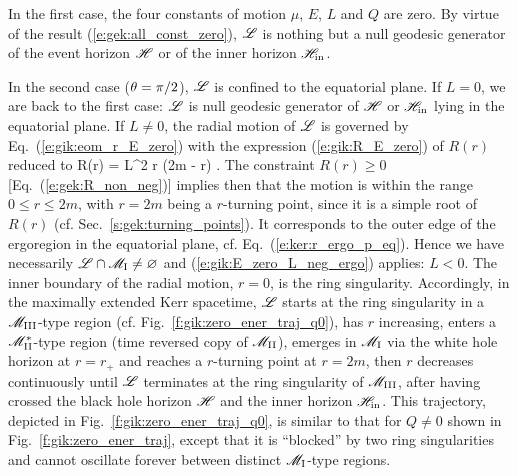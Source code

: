 In the first case, the four constants of motion $\mu$, $E$, $L$ and $Q$ are
zero. By virtue of the result (\ref{e:gek:all_const_zero}), $\mathscr{L}$
is nothing but a null geodesic generator of the event horizon $\mathscr{H}$ or of the
inner horizon $\mathscr{H}_{\rm in}$.

In the second case ($\theta=\pi/2$), $\mathscr{L}$ is confined to the equatorial plane.
If $L=0$, we are back to the first case: $\mathscr{L}$ is null geodesic generator of $\mathscr{H}$ or
$\mathscr{H}_{\rm in}$ lying in the equatorial plane.
If $L\neq 0$, the radial motion of $\mathscr{L}$ is governed by Eq.~(\ref{e:gik:eom_r_E_zero}) with the
expression (\ref{e:gik:R_E_zero}) of $R(r)$ reduced to
\be
    R(r) = L^2 r (2m - r) .
\ee
The constraint $R(r) \geq 0$ [Eq.~(\ref{e:gek:R_non_neg})] implies then
that the motion is within the range $0 \leq r \leq 2 m$, with $r=2m$
being a $r$-turning point, since it is a simple root of $R(r)$ (cf. Sec.~\ref{s:gek:turning_points}).
It corresponds to the outer edge of the ergoregion in the equatorial plane,
cf. Eq.~(\ref{e:ker:r_ergo_p_eq}). Hence we have necessarily $\mathscr{L}\cap \mathscr{M}_{\rm I} \neq \varnothing$
and (\ref{e:gik:E_zero_L_neg_ergo}) applies: $L < 0$.
The inner boundary of the radial motion, $r=0$, is the ring singularity.
Accordingly, in the maximally extended Kerr spacetime, $\mathscr{L}$ starts at the ring
singularity in a $\mathscr{M}_{\rm III}$-type region (cf. Fig.~\ref{f:gik:zero_ener_traj_q0}),
has $r$ increasing, enters
a $\mathscr{M}_{\rm II}^*$-type region (time reversed copy of $\mathscr{M}_{\rm II}$), emerges
in $\mathscr{M}_{\rm I}$ via the white hole horizon at $r=r_+$ and reaches a $r$-turning point at
$r=2m$, then $r$ decreases continuously until $\mathscr{L}$ terminates at the ring
singularity of $\mathscr{M}_{\rm III}$, after having crossed the black hole horizon $\mathscr{H}$
and the inner horizon $\mathscr{H}_{\rm in}$.
This trajectory, depicted in
Fig.~\ref{f:gik:zero_ener_traj_q0}, is similar to that for $Q\neq 0$
shown in Fig.~\ref{f:gik:zero_ener_traj}, except that it is ``blocked''
by two ring singularities and cannot oscillate forever between distinct
$\mathscr{M}_{\rm I}$-type regions.

